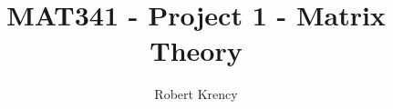 \documentclass[12pt]{article}
\title{MAT341 - Project 1 - Matrix Theory}
\author{Robert Krency}
\begin{document}
\maketitle



\begin{multicols*}{2}
  
  
   
  
\end{multicols*}



\end{document}
